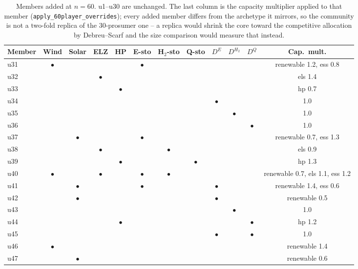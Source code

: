 \begin{table}[!t]
\caption{Members added at $n=60$. u1--u30 are unchanged. The last column is the capacity multiplier applied to that member (\texttt{apply\_60player\_overrides}); every added member differs from the archetype it mirrors, so the community is not a two-fold replica of the 30-prosumer one -- a replica would shrink the core toward the competitive allocation by Debreu--Scarf and the size comparison would measure that instead.}
\label{tab:config60}
\centering
\footnotesize
\setlength{\tabcolsep}{3pt}
\begin{tabular}{@{}lccccccccccc@{}}
\toprule
Member & Wind & Solar & ELZ & HP & E-sto & H$_2$-sto & Q-sto & $D^{E}$ & $D^{H_2}$ & $D^{Q}$ & Cap.\ mult. \\
\midrule
u31 & $\bullet$ &  &  &  & $\bullet$ &  &  &  &  &  & renewable 1.2, ess 0.8 \\
u32 &  &  & $\bullet$ &  &  &  &  &  &  &  & els 1.4 \\
u33 &  &  &  & $\bullet$ &  &  &  &  &  &  & hp 0.7 \\
u34 &  &  &  &  &  &  &  & $\bullet$ &  &  & 1.0 \\
u35 &  &  &  &  &  &  &  &  & $\bullet$ &  & 1.0 \\
u36 &  &  &  &  &  &  &  &  &  & $\bullet$ & 1.0 \\
u37 &  & $\bullet$ &  &  & $\bullet$ &  &  &  &  &  & renewable 0.7, ess 1.3 \\
u38 &  &  & $\bullet$ &  &  & $\bullet$ &  &  &  &  & els 0.9 \\
u39 &  &  &  & $\bullet$ &  &  & $\bullet$ &  &  &  & hp 1.3 \\
u40 & $\bullet$ &  & $\bullet$ &  & $\bullet$ & $\bullet$ &  &  &  &  & renewable 0.7, els 1.1, ess 1.2 \\
u41 &  & $\bullet$ &  &  & $\bullet$ &  &  & $\bullet$ &  &  & renewable 1.4, ess 0.6 \\
u42 &  & $\bullet$ &  &  &  &  &  & $\bullet$ &  &  & renewable 0.5 \\
u43 &  &  &  &  &  &  &  &  & $\bullet$ &  & 1.0 \\
u44 &  &  &  & $\bullet$ &  &  &  &  &  & $\bullet$ & hp 1.2 \\
u45 &  &  &  &  &  &  &  & $\bullet$ &  & $\bullet$ & 1.0 \\
u46 & $\bullet$ &  &  &  &  &  &  &  &  &  & renewable 1.4 \\
u47 &  & $\bullet$ &  &  &  &  &  &  &  &  & renewable 0.6 \\

\end{tabular}
\end{table}
